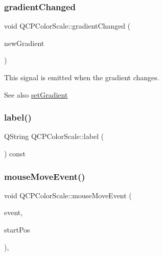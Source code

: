 \mbox{\label{class_q_c_p_color_scale_a5e5f8c5626242c8f7308bfab74d3d989}} 
\subsubsection{\texorpdfstring{gradient\+Changed}{gradientChanged}}
{\footnotesize\ttfamily void Q\+C\+P\+Color\+Scale\+::gradient\+Changed (\begin{DoxyParamCaption}\item[{const \hyperlink{class_q_c_p_color_gradient}{Q\+C\+P\+Color\+Gradient} \&}]{new\+Gradient }\end{DoxyParamCaption})\hspace{0.3cm}{\ttfamily [signal]}}

This signal is emitted when the gradient changes.

\begin{DoxySeeAlso}{See also}
\hyperlink{class_q_c_p_color_scale_a1f29583bb6f1e7f473b62fb712be3940}{set\+Gradient} 
\end{DoxySeeAlso}
\mbox{\label{class_q_c_p_color_scale_a3dbac1121a90172d62f01ab80b1ad641}} 
\subsubsection{\texorpdfstring{label()}{label()}}
{\footnotesize\ttfamily Q\+String Q\+C\+P\+Color\+Scale\+::label (\begin{DoxyParamCaption}{ }\end{DoxyParamCaption}) const}

\mbox{\label{class_q_c_p_color_scale_a3b2bd79725aefaf2630fc76e90939442}} 
\subsubsection{\texorpdfstring{mouse\+Move\+Event()}{mouseMoveEvent()}}
{\footnotesize\ttfamily void Q\+C\+P\+Color\+Scale\+::mouse\+Move\+Event (\begin{DoxyParamCaption}\item[{Q\+Mouse\+Event $\ast$}]{event,  }\item[{const Q\+PointF \&}]{start\+Pos }\end{DoxyParamCaption})\hspace{0.3cm}{\ttfamily [protected]}, {\ttfamily [virtual]}}

